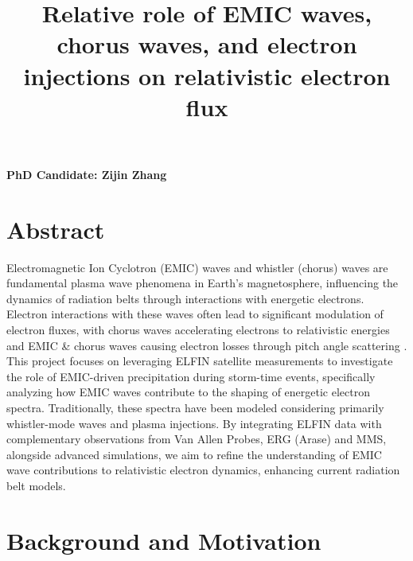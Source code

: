 \documentclass[
  letterpaper,
  DIV=11,
  numbers=noendperiod]{scrartcl}
\title{Relative role of EMIC waves, chorus waves, and electron injections on relativistic electron flux}
\author{}
\date{}
\begin{document}
\maketitle

\vspace{-20truemm}


\textbf{PhD Candidate: Zijin Zhang}

\section{Abstract}\label{abstract}

Electromagnetic Ion Cyclotron (EMIC) waves and whistler (chorus) waves are fundamental plasma wave phenomena in Earth's magnetosphere, influencing the dynamics of radiation belts through interactions with energetic electrons. Electron interactions with these waves often lead to significant modulation of electron fluxes, with chorus waves accelerating electrons to relativistic energies \citep{miyoshiRebuildingProcessOuter2003} and EMIC \& chorus waves causing electron losses through pitch angle scattering \citep{summersRelativisticElectronPitchangle2003, summersTimescalesRadiationBelt2007}.
This project focuses on leveraging ELFIN satellite measurements to investigate the role of EMIC-driven precipitation during storm-time events, specifically analyzing how EMIC waves contribute to the shaping of energetic electron spectra. Traditionally, these spectra have been modeled considering primarily whistler-mode waves and plasma injections. By integrating ELFIN data with complementary observations from Van Allen Probes, ERG (Arase) and MMS, alongside advanced simulations, we aim to refine the understanding of EMIC wave contributions to relativistic electron dynamics, enhancing current radiation belt models.

\section{Background and Motivation}\label{background-and-motivation}
\end{document}
